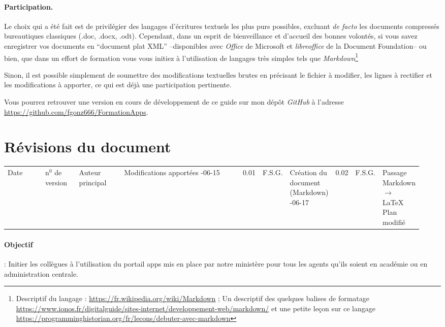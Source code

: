 \documentclass[a4paper, 11pt]{book}
\begin{document}
\paragraph*{Participation.}
Le choix qui a été fait est de privilégier des langages d'écritures textuels les plus purs possibles, excluant \emph{de facto\/} les documents compressés bureautiques classiques (.doc, .docx, .odt). 
Cependant, dans un esprit de bienveillance et d'accueil des bonnes volontés, si vous savez enregistrer vos documents en ``document plat XML'' --disponibles avec \emph{Office} de Microsoft et \emph{libreoffice} de la Document Foundation-- ou bien, que dans un effort de formation vous vous initiez à l'utilisation de langages très simples tels que \emph{Markdown}\footnote{%
Descriptif du langage : \url{https://fr.wikipedia.org/wiki/Markdown} ; Un descriptif des quelques balises de formatage \url{https://www.ionos.fr/digitalguide/sites-internet/developpement-web/markdown/} et une petite leçon sur ce langage \url{https://programminghistorian.org/fr/lecons/debuter-avec-markdown}
}

Sinon, il est possible simplement de soumettre des modifications textuelles brutes en précisant le fichier à modifier, les lignes à rectifier et les modifications à apporter, ce qui est déjà une participation pertinente.

Vous pourrez retrouver une version en cours de développement de ce guide sur mon dépôt \emph{GitHub} à l'adresse \url{https://github.com/fgonz666/FormationApps}.

\section*{Révisions du document}
\begin{table}
	\centering
	\renewcommand{\arraystretch}{1.25}
	\begin{tabular}{| m{0.15\linewidth} | m{0.1\linewidth} | m{0.15\linewidth} | m{0.55\linewidth} |}
		\hline
		Date & n$^0$ de version & Auteur principal & Modifications apportées \cr
		-06-15 & 0.01 & F.S.G. & Création du document (Markdown) \cr
		-06-17 & 0.02 & F.S.G. & Passage Markdown $\rightarrow$ \LaTeX{} \newline Plan modifié \cr
		\hline
	\end{tabular}
\end{table}


\paragraph{Objectif} : Initier les collègues à l'utilisation du portail apps mis en place par notre ministère pour tous les agents qu'ils soient en académie ou en administration centrale. 
\end{document}
